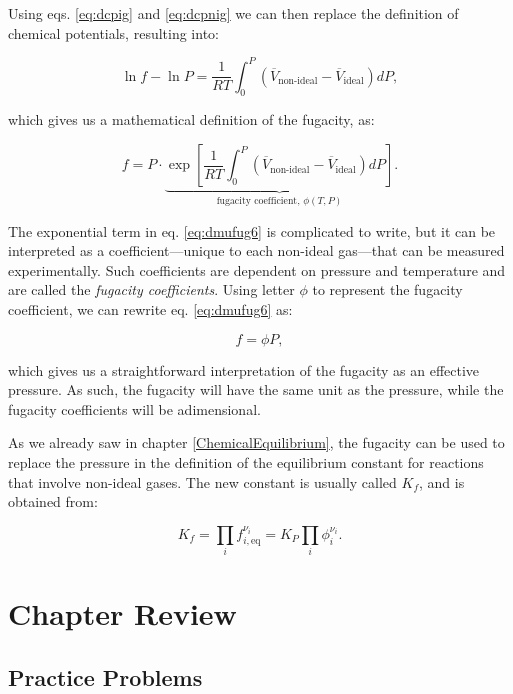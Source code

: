 \documentclass[
  9pt,
]{extbook}
\theoremstyle{definition}
\theoremstyle{definition}
\theoremstyle{definition}
\theoremstyle{remark}
\begin{document}
Using eqs. \eqref{eq:dcpig} and \eqref{eq:dcpnig} we can then replace the definition of chemical potentials, resulting into:

\begin{equation}
\ln f - \ln P = \frac{1}{RT} \int_0^P \left(\overline{V}_{\text{non-ideal}} - \overline{V}_{\text{ideal}} \right) dP,
\label{eq:dmufug5}
\end{equation}

which gives us a mathematical definition of the fugacity, as:

\begin{equation}
f = P \cdot \underbrace{\exp\left[ \frac{1}{RT} \int_0^P \left(\overline{V}_{\text{non-ideal}}-\overline{V}_{\text{ideal}} \right) dP \right]}_{\text{fugacity coefficient, }\phi(T,P)}.
\label{eq:dmufug6}
\end{equation}

The exponential term in eq. \eqref{eq:dmufug6} is complicated to write, but it can be interpreted as a coefficient---unique to each non-ideal gas---that can be measured experimentally. Such coefficients are dependent on pressure and temperature and are called the \emph{fugacity coefficients}. Using letter \(\phi\) to represent the fugacity coefficient, we can rewrite eq. \eqref{eq:dmufug6} as:

\begin{equation}
f = \phi P,
\label{eq:dmufug7}
\end{equation}

which gives us a straightforward interpretation of the fugacity as an effective pressure. As such, the fugacity will have the same unit as the pressure, while the fugacity coefficients will be adimensional.

As we already saw in chapter \ref{ChemicalEquilibrium}, the fugacity can be used to replace the pressure in the definition of the equilibrium constant for reactions that involve non-ideal gases. The new constant is usually called \(K_f\), and is obtained from:

\begin{equation}
K_f=\prod_i f_{i,\text{eq}}^{\nu_i} = K_P \prod_i \phi_{i}^{\nu_i}.
\label{eq:kfdef}
\end{equation}

\hypertarget{rev11}{%
\section{Chapter Review}\label{rev11}}

\hypertarget{exer11}{%
\subsection{Practice Problems}\label{exer11}}
\end{document}
